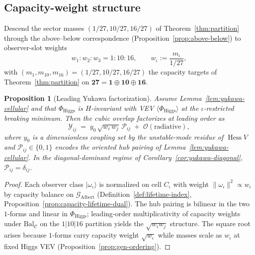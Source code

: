 \documentclass[11pt]{article}
\theoremstyle{plain}
\newtheorem{proposition}[theorem]{Proposition}
\theoremstyle{definition}
\theoremstyle{remark}
\numberwithin{equation}{section}
\newcommand{\Hess}{\operatorname{Hess}}
\begin{document}
\subsection{Capacity-weight structure}
\label{sec:yukawa:weights}

Descend the sector masses $(1/27,10/27,16/27)$ of Theorem~\ref{thm:partition}
through the above--below correspondence (Proposition~\ref{prop:above-below})
to observer-slot weights
\begin{equation}\label{eq:yukawa-weights}
  w_1:w_2:w_3 = 1:10:16,
  \qquad
  w_\iota := \frac{m_\iota}{1/27},
\end{equation}
with $(m_1,m_{10},m_{16})=(1/27,10/27,16/27)$ the capacity targets of
Theorem~\ref{thm:partition} on $\mathbf{27}=\mathbf{1}\oplus\mathbf{10}\oplus\mathbf{16}$.

\begin{proposition}[Leading Yukawa factorization]\label{prop:yukawa-factor}
Assume Lemma~\ref{lem:yukawa-cellular} and that $\Phi_{\mathrm{Higgs}}$ is
$H$-invariant with VEV $\langle\Phi_{\mathrm{Higgs}}\rangle$ at the
$\iota$-restricted breaking minimum. Then the cubic overlap factorizes at
leading order as
\begin{equation}\label{eq:yukawa-factor}
  \mathcal{Y}_{ij}
  \;=\;
  y_0\,\sqrt{w_i\,w_j}\,\mathcal{P}_{ij}
  \;+\;\mathcal{O}(\text{radiative}),
\end{equation}
where $y_0$ is a dimensionless coupling set by the unstable-mode residue of
$\Hess V$ and $\mathcal{P}_{ij}\in\{0,1\}$ encodes the oriented hub pairing
of Lemma~\ref{lem:yukawa-cellular}. In the diagonal-dominant regime of
Corollary~\ref{cor:yukawa-diagonal}, $\mathcal{P}_{ij}=\delta_{ij}$.
\end{proposition}

\begin{proof}
Each observer class $|\omega_\iota\rangle$ is normalized on cell $C_\iota$ with
weight $\|{\omega_\iota}\|^2\propto w_\iota$ by capacity balance on
$\mathcal{G}_{\mathrm{Albert}}$ (Definition~\ref{def:lifetime-index},
Proposition~\ref{prop:capacity-lifetime-dual}). The hub pairing is bilinear
in the two $1$-forms and linear in $\Phi_{\mathrm{Higgs}}$; leading-order
multiplicativity of capacity weights under $\mathrm{Bal}_{\mathcal{C}}$ on
the $1|10|16$ partition yields the $\sqrt{w_i w_j}$ structure. The square
root arises because $1$-forms carry capacity weight $\sqrt{w_\iota}$ while
masses scale as $w_\iota$ at fixed Higgs VEV
(Proposition~\ref{prop:gen-ordering}).
\end{proof}
\end{document}
